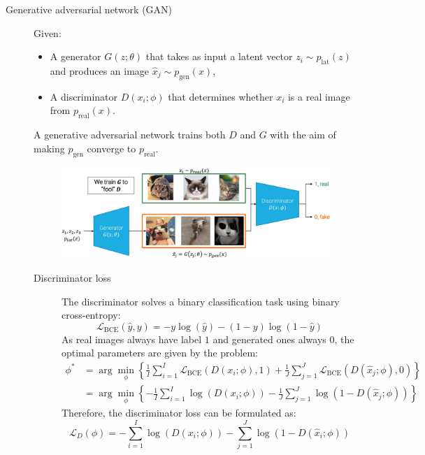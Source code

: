 \begin{description}
    \item[Generative adversarial network (GAN)] 
        Given:
        \begin{itemize}
            \item A generator $G(z; \theta)$ that takes as input a latent vector $z_i \sim p_\text{lat}(z)$ and produces an image $\hat{x}_j \sim p_\text{gen}(x)$,
            \item A discriminator $D(x_i; \phi)$ that determines whether $x_i$ is a real image from $p_\text{real}(x)$.
        \end{itemize}
        A generative adversarial network trains both $D$ and $G$ with the aim of making $p_\text{gen}$ converge to $p_\text{real}$.

        \begin{figure}[H]
            \centering
            \includegraphics[width=0.8\linewidth]{./img/_gan_flow.jpg}
        \end{figure}


        \begin{description}
            \item[Discriminator loss] 
                The discriminator solves a binary classification task using binary cross-entropy:
                \[ \mathcal{L}_\text{BCE}(\hat{y}, y) = -y \log(\hat{y}) - (1-y)\log(1-\hat{y}) \]
                As real images always have label $1$ and generated ones always $0$, the optimal parameters are given by the problem:
                \[ 
                    \begin{split}
                        \phi^* &= \arg\min_{\phi} \left\{ 
                            \frac{1}{I} \sum_{i=1}^I \mathcal{L}_\text{BCE}(D(x_i; \phi), 1) + 
                            \frac{1}{J} \sum_{j=1}^J \mathcal{L}_\text{BCE}(D(\hat{x}_j; \phi), 0) 
                        \right\} \\ 
                        &= \arg\min_{\phi} \left\{ 
                            -\frac{1}{I} \sum_{i=1}^I \log \left( D(x_i; \phi) \right) - 
                            \frac{1}{J} \sum_{j=1}^J \log \left( 1- D(\hat{x}_j; \phi) \right) 
                        \right\}
                    \end{split}
                \]
                Therefore, the discriminator loss can be formulated as:
                \[ \mathcal{L}_D(\phi) = - \sum_{i=1}^{I} \log(D(x_i; \phi)) - \sum_{j=1}^{J} \log(1-D(\hat{x}_i; \phi)) \]


\end{description}
\end{description}
